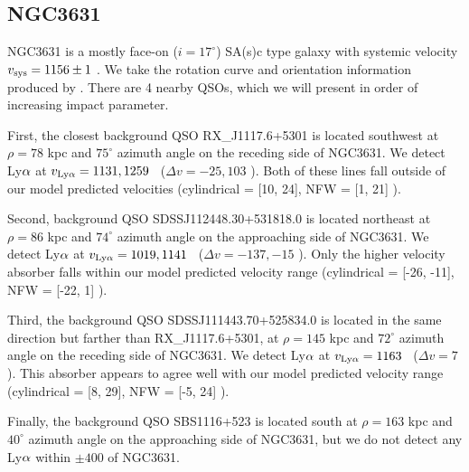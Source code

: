 

\subsection{NGC3631}
NGC3631 is a mostly face-on ($i = 17^{\circ}$) SA(s)c type galaxy with systemic velocity $v_{\rm sys} = 1156 \pm 1$ \kms. We take the rotation curve and orientation information produced by \cite{knapen1997}. There are 4 nearby QSOs, which we will present in order of increasing impact parameter.

First, the closest background QSO RX\_J1117.6+5301 is located southwest at $\rho = 78$ kpc and $75^{\circ}$ azimuth angle on the receding side of NGC3631. We detect Ly$\rm \alpha$ at $v_{\rm Ly\alpha} = 1131, 1259$ \kms~($\Delta v = -25, 103$ \kms). Both of these lines fall outside of our model predicted velocities (cylindrical = [10, 24], NFW = [1, 21] \kms).

Second, background QSO SDSSJ112448.30+531818.0 is located northeast at $\rho = 86$ kpc and $74^{\circ}$ azimuth angle on the approaching side of NGC3631. We detect Ly$\rm \alpha$ at $v_{\rm Ly\alpha} = 1019, 1141$ \kms~($\Delta v = -137, -15$ \kms). Only the higher velocity absorber falls within our model predicted velocity range (cylindrical = [-26, -11], NFW = [-22, 1] \kms).

Third, the background QSO SDSSJ111443.70+525834.0 is located in the same direction but farther than RX\_J1117.6+5301, at $\rho = 145$ kpc and $72^{\circ}$ azimuth angle on the receding side of NGC3631. We detect Ly$\rm \alpha$ at $v_{\rm Ly\alpha} = 1163$ \kms~($\Delta v = 7$ \kms). This absorber appears to agree well with our model predicted velocity range (cylindrical = [8, 29], NFW = [-5, 24] \kms).

Finally, the background QSO SBS1116+523 is located south at $\rho = 163$ kpc and $40^{\circ}$ azimuth angle on the approaching side of NGC3631, but we do not detect any Ly$\rm \alpha$ within $\pm400$ of NGC3631.






